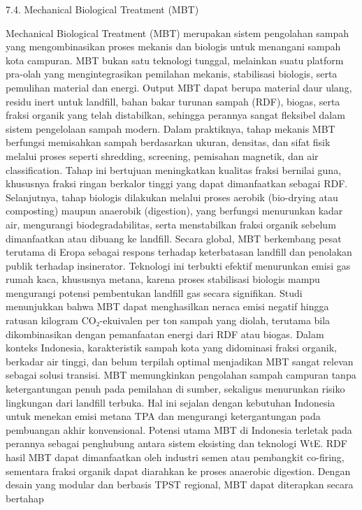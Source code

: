 \documentclass[
  letterpaper,
  DIV=11,
  numbers=noendperiod]{scrreprt}
\begin{document}
7.4. Mechanical Biological Treatment (MBT)

Mechanical Biological Treatment (MBT) merupakan sistem pengolahan sampah
yang mengombinasikan proses mekanis dan biologis untuk menangani sampah
kota campuran. MBT bukan satu teknologi tunggal, melainkan suatu
platform pra-olah yang mengintegrasikan pemilahan mekanis, stabilisasi
biologis, serta pemulihan material dan energi. Output MBT dapat berupa
material daur ulang, residu inert untuk landfill, bahan bakar turunan
sampah (RDF), biogas, serta fraksi organik yang telah distabilkan,
sehingga perannya sangat fleksibel dalam sistem pengelolaan sampah
modern. Dalam praktiknya, tahap mekanis MBT berfungsi memisahkan sampah
berdasarkan ukuran, densitas, dan sifat fisik melalui proses seperti
shredding, screening, pemisahan magnetik, dan air classification. Tahap
ini bertujuan meningkatkan kualitas fraksi bernilai guna, khususnya
fraksi ringan berkalor tinggi yang dapat dimanfaatkan sebagai RDF.
Selanjutnya, tahap biologis dilakukan melalui proses aerobik (bio-drying
atau composting) maupun anaerobik (digestion), yang berfungsi menurunkan
kadar air, mengurangi biodegradabilitas, serta menstabilkan fraksi
organik sebelum dimanfaatkan atau dibuang ke landfill. Secara global,
MBT berkembang pesat terutama di Eropa sebagai respons terhadap
keterbatasan landfill dan penolakan publik terhadap insinerator.
Teknologi ini terbukti efektif menurunkan emisi gas rumah kaca,
khususnya metana, karena proses stabilisasi biologis mampu mengurangi
potensi pembentukan landfill gas secara signifikan. Studi menunjukkan
bahwa MBT dapat menghasilkan neraca emisi negatif hingga ratusan
kilogram CO₂-ekuivalen per ton sampah yang diolah, terutama bila
dikombinasikan dengan pemanfaatan energi dari RDF atau biogas. Dalam
konteks Indonesia, karakteristik sampah kota yang didominasi fraksi
organik, berkadar air tinggi, dan belum terpilah optimal menjadikan MBT
sangat relevan sebagai solusi transisi. MBT memungkinkan pengolahan
sampah campuran tanpa ketergantungan penuh pada pemilahan di sumber,
sekaligus menurunkan risiko lingkungan dari landfill terbuka. Hal ini
sejalan dengan kebutuhan Indonesia untuk menekan emisi metana TPA dan
mengurangi ketergantungan pada pembuangan akhir konvensional. Potensi
utama MBT di Indonesia terletak pada perannya sebagai penghubung antara
sistem eksisting dan teknologi WtE. RDF hasil MBT dapat dimanfaatkan
oleh industri semen atau pembangkit co-firing, sementara fraksi organik
dapat diarahkan ke proses anaerobic digestion. Dengan desain yang
modular dan berbasis TPST regional, MBT dapat diterapkan secara bertahap
\end{document}
